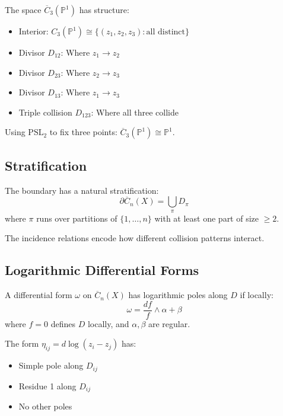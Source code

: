 \begin{example}
The space $\overline{C}_3(\mathbb{P}^1)$ has structure:
\begin{itemize}
\item Interior: $C_3(\mathbb{P}^1) \cong \{(z_1, z_2, z_3) : \text{all distinct}\}$
\item Divisor $D_{12}$: Where $z_1 \to z_2$
\item Divisor $D_{23}$: Where $z_2 \to z_3$  
\item Divisor $D_{13}$: Where $z_1 \to z_3$
\item Triple collision $D_{123}$: Where all three collide
\end{itemize}
Using $\text{PSL}_2$ to fix three points: $\overline{C}_3(\mathbb{P}^1) \cong \mathbb{P}^1$.
\end{example}

\subsection{Stratification}

\begin{theorem}
The boundary has a natural stratification:
$$\partial\overline{C}_n(X) = \bigcup_{\pi} D_\pi$$
where $\pi$ runs over partitions of $\{1, \ldots, n\}$ with at least one part of size $\geq 2$.
\end{theorem}

The incidence relations encode how different collision patterns interact.

\subsection{Logarithmic Differential Forms}

\begin{definition}
A differential form $\omega$ on $\overline{C}_n(X)$ has logarithmic poles along $D$ if locally:
$$\omega = \frac{df}{f} \wedge \alpha + \beta$$
where $f = 0$ defines $D$ locally, and $\alpha, \beta$ are regular.
\end{definition}

\begin{lemma}
The form $\eta_{ij} = d\log(z_i - z_j)$ has:
\begin{itemize}
\item Simple pole along $D_{ij}$
\item Residue 1 along $D_{ij}$
\item No other poles
\end{itemize}
\end{lemma}

